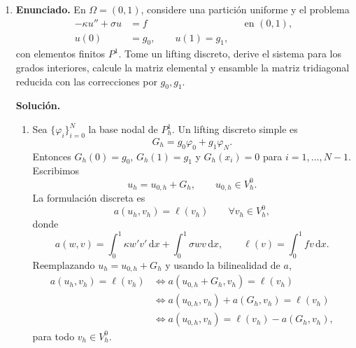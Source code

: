 \documentclass[11pt]{article}
\def\dx{\mbox{\(\,\mathrm{d}x\)}}
\begin{document}
\begin{enumerate}[label=\textbf{\arabic*.}, leftmargin=*]

    \item \textbf{Enunciado.} En $\Omega=(0,1)$, considere una partición uniforme y el problema
    \[
    \begin{aligned}
        -\kappa u''+\sigma u&=f &&\text{en }(0,1),\\
        u(0)&=g_0,\qquad u(1)=g_1,
    \end{aligned}
    \]
    con elementos finitos $P^1$. Tome un lifting discreto, derive el sistema para los grados interiores, calcule la matriz elemental y ensamble la matriz tridiagonal reducida con las correcciones por $g_0,g_1$.

    \textbf{Solución.}
    \begin{enumerate}[label=(\alph*)]
        \item Sea $\{\varphi_i\}_{i=0}^N$ la base nodal de $P^1_h$. Un lifting discreto simple es
        \[
            G_h=g_0\varphi_0+g_1\varphi_N.
        \]
        Entonces $G_h(0)=g_0$, $G_h(1)=g_1$ y $G_h(x_i)=0$ para $i=1,\dots,N-1$. Escribimos
        \[
            u_h=u_{0,h}+G_h,
            \qquad
            u_{0,h}\in V_h^0.
        \]
        La formulación discreta es
        \[
            a(u_h,v_h)=\ell(v_h)
            \qquad\forall v_h\in V_h^0,
        \]
        donde
        \[
            a(w,v)=\int_0^1\kappa w'v'\dx+\int_0^1\sigma wv\dx,
            \qquad
            \ell(v)=\int_0^1fv\dx.
        \]
        Reemplazando $u_h=u_{0,h}+G_h$ y usando la bilinealidad de $a$,
        \[
        \begin{aligned}
            a(u_h,v_h)=\ell(v_h)
            &\Longleftrightarrow
            a(u_{0,h}+G_h,v_h)=\ell(v_h)\\
            &\Longleftrightarrow
            a(u_{0,h},v_h)+a(G_h,v_h)=\ell(v_h)\\
            &\Longleftrightarrow
            a(u_{0,h},v_h)=\ell(v_h)-a(G_h,v_h),
        \end{aligned}
        \]
        para todo $v_h\in V_h^0$.


\end{enumerate}
\end{enumerate}
\end{document}
